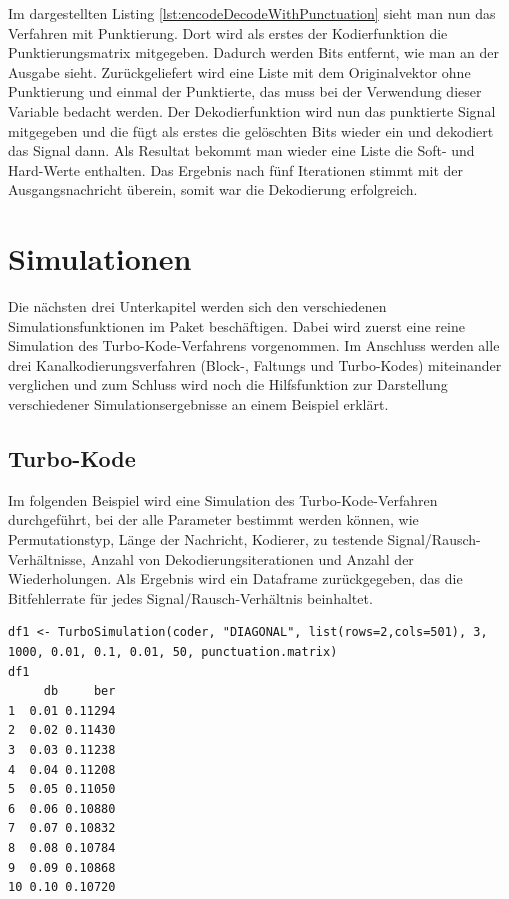 Im dargestellten Listing \ref{lst:encodeDecodeWithPunctuation} sieht man nun das Verfahren mit Punktierung. Dort wird als erstes der Kodierfunktion die Punktierungsmatrix mitgegeben. Dadurch werden Bits entfernt, wie man an der Ausgabe sieht. Zurückgeliefert wird eine Liste mit dem Originalvektor ohne Punktierung und einmal der Punktierte, das muss bei der Verwendung dieser Variable bedacht werden. Der Dekodierfunktion wird nun das punktierte Signal mitgegeben und die fügt als erstes die gelöschten Bits wieder ein und dekodiert das Signal dann. Als Resultat bekommt man wieder eine Liste die Soft- und Hard-Werte enthalten. Das Ergebnis nach fünf Iterationen stimmt mit der Ausgangsnachricht überein, somit war die Dekodierung erfolgreich.

\section{Simulationen}
\label{sec:example_simulations}

Die nächsten drei Unterkapitel werden sich den verschiedenen Simulationsfunktionen im Paket beschäftigen. Dabei wird zuerst eine reine Simulation des Turbo-Kode-Verfahrens vorgenommen. Im Anschluss werden alle drei Kanalkodierungsverfahren (Block-, Faltungs und Turbo-Kodes) miteinander verglichen und zum Schluss wird noch die Hilfsfunktion zur Darstellung verschiedener Simulationsergebnisse an einem Beispiel erklärt.

\subsection{Turbo-Kode}
\label{sec:example_simulations_turbo}

Im folgenden Beispiel wird eine Simulation des Turbo-Kode-Verfahren durchgeführt, bei der alle Parameter bestimmt werden können, wie Permutationstyp, Länge der Nachricht, Kodierer, zu testende Signal/Rausch-Verhältnisse, Anzahl von Dekodierungsiterationen und Anzahl der Wiederholungen. Als Ergebnis wird ein Dataframe zurückgegeben, das die Bitfehlerrate für jedes Signal/Rausch-Verhältnis beinhaltet.

\begin{lstlisting}[caption=Turbo-Kode-Simulation, label={lst:turboCodeSimulation}, float=!ht]
df1 <- TurboSimulation(coder, "DIAGONAL", list(rows=2,cols=501), 3, 1000, 0.01, 0.1, 0.01, 50, punctuation.matrix)
df1
     db     ber
1  0.01 0.11294
2  0.02 0.11430
3  0.03 0.11238
4  0.04 0.11208
5  0.05 0.11050
6  0.06 0.10880
7  0.07 0.10832
8  0.08 0.10784
9  0.09 0.10868
10 0.10 0.10720
\end{lstlisting}

